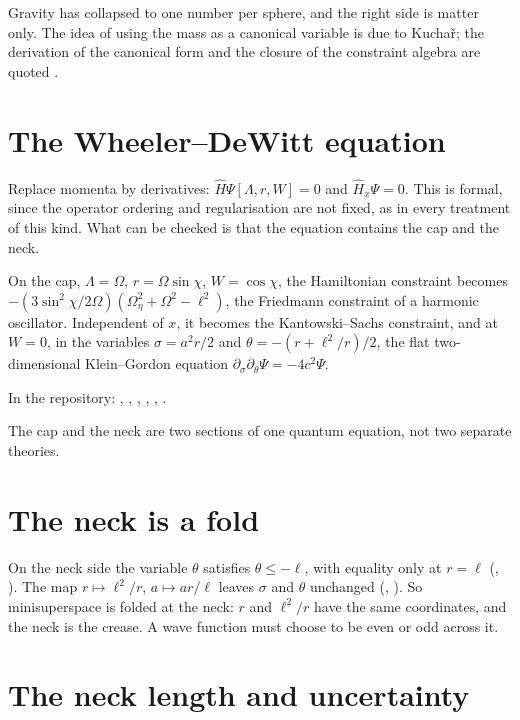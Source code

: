 Gravity has collapsed to one number per sphere, and the right side is matter only. The idea of using the mass as a canonical variable is due to Kucha\v r; the derivation of the canonical form and the closure of the constraint algebra are quoted \external.

\section{The Wheeler--DeWitt equation}

Replace momenta by derivatives: $\hat H\Psi[\Lambda,r,W]=0$ and $\hat H_x\Psi=0$. This is formal, since the operator ordering and regularisation are not fixed, as in every treatment of this kind. What can be checked is that the equation contains the cap and the neck.

\begin{theorem}\proved\label{thm:twosections}
On the cap, $\Lambda=\Omega$, $r=\Omega\sin\chi$, $W=\cos\chi$, the Hamiltonian constraint becomes $-(3\sin^2\chi/2\Omega)(\Omega_\eta^2+\Omega^2-\ell^2)$, the Friedmann constraint of a harmonic oscillator. Independent of $x$, it becomes the Kantowski--Sachs constraint, and at $W=0$, in the variables $\sigma=a^2r/2$ and $\theta=-(r+\ell^2/r)/2$, the flat two-dimensional Klein--Gordon equation $\partial_\sigma\partial_\theta\Psi=-4c^2\Psi$.
\end{theorem}
\noindent In the repository: , , , , , .

The cap and the neck are two sections of one quantum equation, not two separate theories.

\section{The neck is a fold}

On the neck side the variable $\theta$ satisfies $\theta\le-\ell$, with equality only at $r=\ell$ (, ). The map $r\mapsto\ell^2/r$, $a\mapsto ar/\ell$ leaves $\sigma$ and $\theta$ unchanged (, ). So minisuperspace is folded at the neck: $r$ and $\ell^2/r$ have the same coordinates, and the neck is the crease. A wave function must choose to be even or odd across it.

\section{The neck length and uncertainty}

